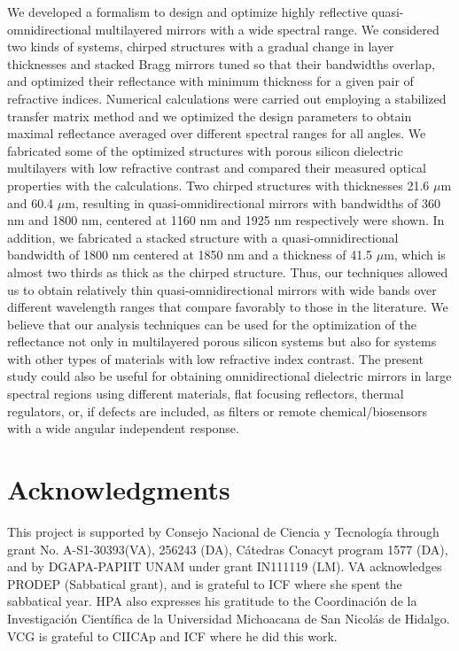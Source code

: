 \documentclass[a4paper,fleqn]{cas-sc}
\newcommand{\hl}[1]{{\color{blue}#1}}
\begin{document}
\hl{We developed a formalism to design and optimize highly
reflective quasi-omnidirectional multilayered mirrors with a wide
spectral range. We considered two kinds of systems, chirped structures with a gradual
change in layer thicknesses and
stacked Bragg mirrors tuned so that their bandwidths overlap, and
optimized their}
reflectance with minimum thickness for a given pair of refractive
indices. Numerical calculations were
carried out employing a stabilized transfer matrix method and we optimized the
design parameters to obtain maximal reflectance averaged over different spectral ranges for
all angles.
We fabricated some of the optimized structures with
porous silicon
dielectric multilayers with low refractive contrast and compared their measured  optical properties
with the calculations. Two chirped structures
with thicknesses 21.6 $\mu$m and 60.4 $\mu$m,
resulting in quasi-omnidirectional mirrors with bandwidths of 360 nm and 1800 nm, centered
\hl{at 1160 nm and 1925 nm respectively were shown. In addition,
we fabricated a stacked structure} with a
quasi-omnidirectional bandwidth of 1800 nm centered at 1850 nm and a
thickness of 41.5 $\mu$m, which is almost two thirds as thick as the chirped structure.
Thus, our techniques allowed us to obtain relatively thin
quasi-omnidirectional mirrors with wide bands
over different wavelength ranges \hl{that compare favorably to those in
the literature.
We believe that our analysis techniques can
be used for the optimization of the reflectance not only in
multilayered porous silicon} systems but also for systems with other types of
materials with low refractive index contrast. The present study could
also be useful for obtaining omnidirectional dielectric mirrors in
large spectral regions using different materials,  flat focusing
reflectors, thermal regulators, or, if
defects are included, as filters or remote chemical/biosensors with
a wide angular independent response.


\section*{Acknowledgments}

This project is supported by Consejo Nacional de Ciencia y
Tecnolog\'{i}a through grant No. A-S1-30393(VA), 256243 (DA), C\'{a}tedras
Conacyt program 1577 (DA), and by DGAPA-PAPIIT UNAM under grant IN111119 (LM).
VA acknowledges PRODEP (Sabbatical grant), and
is grateful to ICF where she spent the sabbatical year.
HPA also expresses his gratitude to the Coordinaci\'{o}n
de la Investigaci\'{o}n Cient\'{i}fica de la Universidad
Michoacana de San Nicol\'{a}s de Hidalgo. VCG is grateful to CIICAp
and ICF where he did this work.

\printcredits



\end{document}
